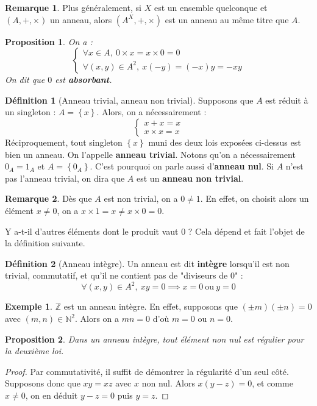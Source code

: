 \documentclass[french]{book}
\newcommand{\N}{\mathbb{N}}
\newcommand{\Z}{\mathbb{Z}}
\theoremstyle{plain}
\newtheorem{prop}{Proposition}[chapter]
\theoremstyle{definition}
\newtheorem{dfn}{Définition}[chapter]
\newtheorem{exa}{Exemple}[chapter]
\newtheorem{rmq}{Remarque}[chapter]
\theoremstyle{remark}
\begin{document}
\begin{rmq}
	Plus généralement, si $X$ est un ensemble quelconque et $(A,+,\times)$ un anneau, alors $(A^X,+,\times)$ est un anneau au même titre que $A$.
\end{rmq}
\begin{prop}
	On a : $$\left \{\begin{array}{ll}\forall x\in A,\ 0\times x=x\times0=0\\ \forall(x,y)\in A^2,\ x(-y)=(-x)y=-xy\end{array}\right.$$ On dit que $0$ est \textbf{absorbant}.
\end{prop}
\begin{dfn}[Anneau trivial, anneau non trivial]
	Supposons que $A$ est réduit à un singleton : $A=\left\{x\right\}$. Alors, on a nécessairement : $$\left \{\begin{array}{ll}x+x=x\\ x\times x=x\end{array}\right.$$ Réciproquement, tout singleton $\left\{x\right\}$ muni des deux lois exposées ci-dessus est bien un anneau. On l'appelle \textbf{anneau trivial}. Notons qu'on a nécessairement $0_A=1_A$ et $A=\left\{0_A\right\}$. C'est pourquoi on parle aussi d'\textbf{anneau nul}. Si $A$ n'est pas l'anneau trivial, on dira que $A$ est un \textbf{anneau non trivial}.
\end{dfn}
\begin{rmq}
	Dès que $A$ est non trivial, on a $0\ne1$. En effet, on choisit alors un élément $x\ne0$, on a $x\times 1=x\ne x\times0=0$.
\end{rmq}
Y a-t-il d'autres éléments dont le produit vaut 0 ? Cela dépend et fait l'objet de la définition suivante.
\begin{dfn}[Anneau intègre]
	Un anneau est dit \textbf{intègre} lorsqu'il est non trivial, commutatif, et qu'il ne contient pas de "diviseurs de $0$" : $$\forall(x,y)\in A^2,\ xy=0\implies x=0 \ \text{ou} \ y=0$$
\end{dfn}
\begin{exa}
	$\Z$ est un anneau intègre. En effet, supposons que $(\pm m)(\pm n)=0$ avec $(m,n)\in\N^2$. Alors on a $mn=0$ d'où $m=0$ ou $n=0$.
\end{exa}
\begin{prop}
	Dans un anneau intègre, tout élément non nul est régulier pour la deuxième loi.
\end{prop}
\begin{proof}
	Par commutativité, il suffit de démontrer la régularité d'un seul côté. Supposons donc que $xy=xz$ avec $x$ non nul. Alors $x(y-z)=0$, et comme $x\ne0$, on en déduit $y-z=0$ puis $y=z$.
\end{proof}
\end{document}
